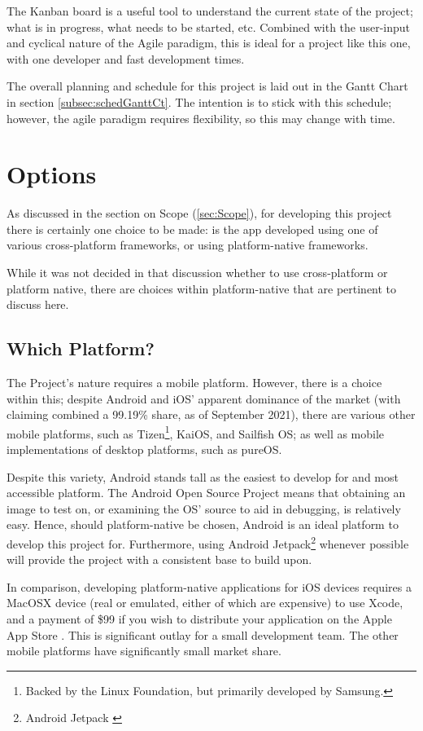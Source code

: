 \documentclass[11pt, a4paper, notitlepage]{report}
\begin{document}
The Kanban board is a useful tool to understand the current state of the 
project; what is in progress, what needs to be started, etc. Combined with the 
user-input and cyclical nature of the Agile paradigm, this is ideal for a 
project like this one, with one developer and fast development times.

The overall planning and schedule for this project is laid out in the Gantt 
Chart in section \ref{subsec:schedGanttCt}. The intention is to stick with this 
schedule; however, the agile paradigm requires flexibility, so this may change 
with time.

\section{Options}
As discussed in the section on Scope (\ref{sec:Scope}), for developing this 
project there is certainly one choice to be made: is the app developed using 
one of various cross-platform frameworks, or using platform-native frameworks.

While it was not decided in that discussion whether to use cross-platform or platform native, there are choices within platform-native that are pertinent to discuss here.

\subsection{Which Platform?}
The Project's nature requires a mobile platform. However, there is a choice 
within this; despite Android and iOS' apparent dominance of the market (with 
\citet{MobileMarketShare} claiming combined a 99.19\% share, as of September 2021), there are various other mobile platforms, such as Tizen\footnote{Backed by the Linux Foundation, but primarily developed by Samsung.}, KaiOS, and Sailfish OS; as well as mobile implementations of desktop platforms, such as pureOS.

Despite this variety, Android stands tall as the easiest to develop for and 
most accessible platform. The Android Open Source Project means that obtaining 
an image to test on, or examining the OS' source to aid in debugging, is 
relatively easy. Hence, should platform-native be chosen, Android is an ideal platform to develop this project for. Furthermore, using Android Jetpack\footnote{Android Jetpack \citep{AndroidJetpack}} whenever possible will provide the project with a consistent base to build upon.

In comparison, developing platform-native applications for iOS devices requires 
a MacOSX device (real or emulated, either of which are expensive) to use Xcode, and a payment of \$99 if you wish to distribute your application on the Apple App Store \citep{AppleDevProgram}. This is significant outlay for a small development team. The other mobile platforms have significantly small market share.
\end{document}
